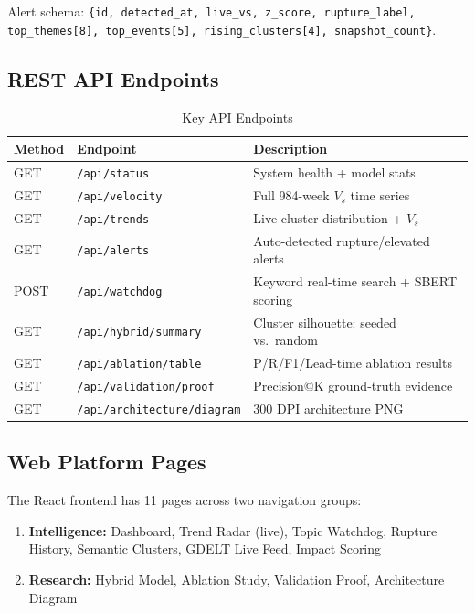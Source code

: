 \documentclass[12pt,a4paper]{article}
\begin{document}
Alert schema: \texttt{\{id, detected\_at, live\_vs, z\_score, rupture\_label,\\
top\_themes[8], top\_events[5], rising\_clusters[4], snapshot\_count\}}.

\subsection{REST API Endpoints}

\begin{table}[H]
\centering
\caption{Key API Endpoints}
\begin{tabular}{lll}
\toprule
\textbf{Method} & \textbf{Endpoint} & \textbf{Description} \\
\midrule
GET & \texttt{/api/status}            & System health + model stats \\
GET & \texttt{/api/velocity}          & Full 984-week $V_s$ time series \\
GET & \texttt{/api/trends}            & Live cluster distribution + $V_s$ \\
GET & \texttt{/api/alerts}            & Auto-detected rupture/elevated alerts \\
POST & \texttt{/api/watchdog}         & Keyword real-time search + SBERT scoring \\
GET & \texttt{/api/hybrid/summary}    & Cluster silhouette: seeded vs.\ random \\
GET & \texttt{/api/ablation/table}    & P/R/F1/Lead-time ablation results \\
GET & \texttt{/api/validation/proof}  & Precision@K ground-truth evidence \\
GET & \texttt{/api/architecture/diagram} & 300 DPI architecture PNG \\
\bottomrule
\end{tabular}
\label{tab:api}
\end{table}

\subsection{Web Platform Pages}

The React frontend has 11 pages across two navigation groups:

\begin{enumerate}[leftmargin=2em]
    \item \textbf{Intelligence:} Dashboard, Trend Radar (live), Topic Watchdog,
          Rupture History, Semantic Clusters, GDELT Live Feed, Impact Scoring
    \item \textbf{Research:} Hybrid Model, Ablation Study, Validation Proof, Architecture Diagram
\end{enumerate}
\end{document}
